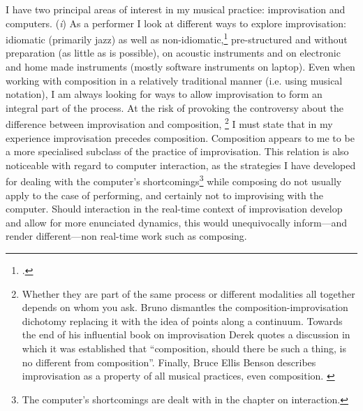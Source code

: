 I have two principal areas of interest in my musical practice: improvisation and computers.
\noindent (\emph{i}) As a performer I look at different ways to explore improvisation: idiomatic (primarily jazz) as well as non-idiomatic,\footcite[The terms, `idiomatic' and `non-idiomatic' are borrowed from Derek Bailey. See][]{bailey92} pre-structured and without preparation (as little as is possible), on acoustic instruments and on electronic and home made instruments (mostly software instruments on laptop). Even when working with composition in a relatively traditional manner (i.e. using musical notation), I am always looking for ways to allow improvisation to form an integral part of the process. 
At the risk of provoking the controversy about the difference between improvisation and composition,
\footnote{Whether they are part of the same process or different modalities all together depends on whom you ask. Bruno \citeauthor{nettl74} dismantles the composition-improvisation dichotomy replacing it with the idea of points along a continuum. \parencite{nettl74} Towards the end of his influential book on improvisation Derek \citeauthor{bailey92} quotes a discussion in which it was established that ``composition, should there be such a thing, is no different from composition''. \parencite[140]{bailey92} Finally, Bruce Ellis Benson describes improvisation as a property of all musical practices, even composition. \parencite{benson03}} 
I must state that in my experience improvisation precedes composition. Composition appears to me to be a more specialised subclass of the practice of improvisation. This relation is also noticeable with regard to computer interaction, as the strategies I have developed for dealing with the computer's shortcomings\footnote{The computer's shortcomings are dealt with in the chapter on interaction.} while composing do not usually apply to the case of performing, and certainly not to improvising with the computer. Should interaction in the real-time context of improvisation develop and allow for more enunciated dynamics, this would unequivocally inform---and render different---non real-time work such as composing.

